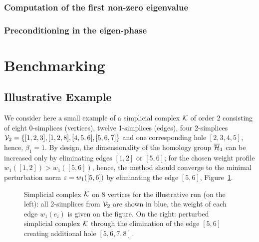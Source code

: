 \subsubsection{ Computation of the first non-zero eigenvalue }

\subsubsection{ Preconditioning in the eigen-phase }







\section{ Benchmarking }

\subsection{Illustrative Example}\label{sec:illustrarive_example}

We consider here a small example 
of a simplicial complex $\mathcal{K}$ of order 2 
consisting of eight 0-simplices (vertices), twelve 1-simplices (edges),  four 2-simplices $\mathcal{V}_2 = \{[1,2,3], [1,2,8], [4,5,6],[5,6,7]\}$   and one corresponding hole $[2,3,4,5]$, hence, $\beta_1 = 1$. By design, the dimensionality of the homology group $\overline{\mathcal{H}}_1$ can be increased only by eliminating edges $[1,2]$ or $[5,6]$; for the chosen weight profile  $w_1([1,2]) > w_1([5,6])$, hence, the method should converge to the minimal perturbation norm $\varepsilon = w_1([5,6])$ by eliminating the edge $[5,6]$, Figure~\ref{fig:illustrative_start}.


\begin{figure}[t]
    \centering
    
    \caption{
    Simplicial complex $\mathcal{K}$ on $8$ vertices for the illustrative run (on the left): all 2-simplices from $\mathcal{V}_2$ are shown in blue, the weight of each edge $w_1(e_i)$ is given on the figure. On the right: perturbed simplicial complex $\mathcal{K}$ through the elimination of the edge $[5,6]$ creating additional hole $[5, 6, 7, 8]$.
    \label{fig:illustrative_start}
    }
\end{figure}


